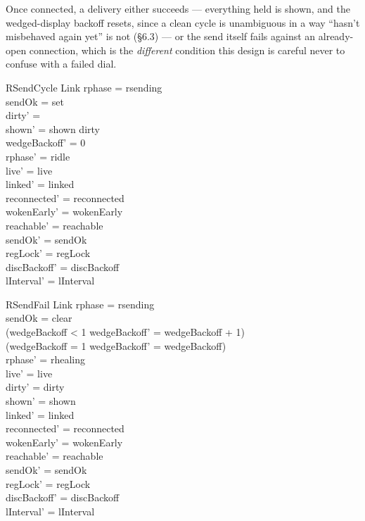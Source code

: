 \documentclass[a4paper,10pt,fleqn]{article}
\begin{document}
Once connected, a delivery either succeeds --- everything held is shown,
and the wedged-display backoff resets, since a clean cycle is unambiguous
in a way ``hasn't misbehaved again yet'' is not (\S6.3) --- or the send
itself fails against an already-open connection, which is the
\emph{different} condition this design is careful never to confuse with a
failed dial.

\begin{schema}{RSendCycle}
  \Delta Link
\where
  rphase = rsending \\
  sendOk = set \\
  dirty' = \emptyset \\
  shown' = shown \cup dirty \\
  wedgeBackoff' = 0 \\
  rphase' = ridle \\
  live' = live \\ linked' = linked \\ reconnected' = reconnected \\
  wokenEarly' = wokenEarly \\ reachable' = reachable \\ sendOk' = sendOk \\
  regLock' = regLock \\ discBackoff' = discBackoff \\
  lInterval' = lInterval
\end{schema}

\begin{schema}{RSendFail}
  \Delta Link
\where
  rphase = rsending \\
  sendOk = clear \\
  (wedgeBackoff < 1 \implies wedgeBackoff' = wedgeBackoff + 1) \\
  (wedgeBackoff = 1 \implies wedgeBackoff' = wedgeBackoff) \\
  rphase' = rhealing \\
  live' = live \\ dirty' = dirty \\ shown' = shown \\ linked' = linked \\
  reconnected' = reconnected \\ wokenEarly' = wokenEarly \\
  reachable' = reachable \\ sendOk' = sendOk \\ regLock' = regLock \\
  discBackoff' = discBackoff \\ lInterval' = lInterval
\end{schema}
\end{document}
